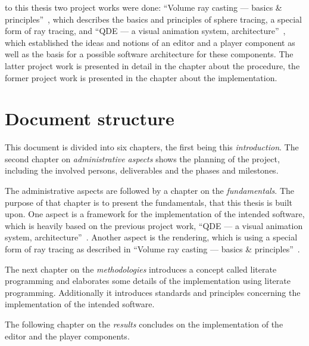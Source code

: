 \documentclass[%
    a4paper,    %
    justified,  %
    nobib,      %
    openany     %
]{tufte-book}
\begin{document}
 to this thesis two project works were done:
\enquote{Volume ray casting --- basics \&
principles}~\cite{osterwalder-volume-2016}, which describes the basics and
principles of sphere tracing, a special form of ray tracing, and \enquote{QDE
--- a visual animation system, architecture}~\cite{osterwalder-qde-2016}, which
established the ideas and notions of an editor and a player component as well as
the basis for a possible software architecture for these components. The latter
project work is presented in detail in the chapter about the procedure, the
former project work is presented in the chapter about the implementation.

\section{Document structure}
\label{sec:document-structure}

This document is divided into six chapters, the first being this \textit{introduction}. The
second chapter on \textit{administrative aspects} shows the planning of the
project, including the involved persons, deliverables and the phases and
milestones.

The administrative aspects are followed by a chapter on the
\textit{fundamentals}. The purpose of that chapter is to present the
fundamentals, that this thesis is built upon. One aspect is a framework for the
implementation of the intended software, which is heavily based on the previous
project work, \enquote{QDE --- a visual animation system, architecture}~\cite{osterwalder-qde-2016}. Another aspect is the rendering,
which is using a special form of ray tracing as described in ``Volume ray
casting --- basics \& principles''~\cite{osterwalder-volume-2016}.

The next chapter on the \textit{methodologies} introduces a concept called
literate programming and elaborates some details of the implementation using
literate programming. Additionally it introduces standards and principles
concerning the implementation of the intended software.

The following chapter on the \textit{results} concludes on the implementation
of the editor and the player components.

\end{document}
